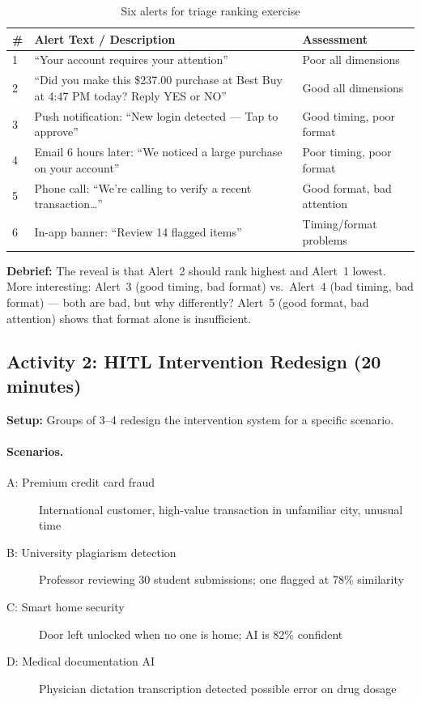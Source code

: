 \begin{table}[htbp]
\caption{Six alerts for triage ranking exercise}
\label{tab:alert-triage}
\centering
\begin{tabular}{@{}p{1cm}p{7cm}p{3.5cm}@{}}
\toprule
\textbf{\#} & \textbf{Alert Text / Description} & \textbf{Assessment} \\
\midrule
1 & ``Your account requires your attention'' & Poor all dimensions \\
2 & ``Did you make this \$237.00 purchase at Best Buy at 4:47 PM today? Reply YES or NO'' & Good all dimensions \\
3 & Push notification: ``New login detected --- Tap to approve'' & Good timing, poor format \\
4 & Email 6 hours later: ``We noticed a large purchase on your account'' & Poor timing, poor format \\
5 & Phone call: ``We're calling to verify a recent transaction\ldots'' & Good format, bad attention \\
6 & In-app banner: ``Review 14 flagged items'' & Timing/format problems \\
\bottomrule
\end{tabular}
\end{table}

\textbf{Debrief:} The reveal is that Alert~2 should rank highest and Alert~1 lowest. More interesting: Alert~3 (good timing, bad format) vs.\ Alert~4 (bad timing, bad format) --- both are bad, but why differently? Alert~5 (good format, bad attention) shows that format alone is insufficient.

\subsection{Activity 2: HITL Intervention Redesign (20 minutes)}

\textbf{Setup:} Groups of 3--4 redesign the intervention system for a specific scenario.

\paragraph{Scenarios.}
\begin{description}
    \item[A: Premium credit card fraud] International customer, high-value transaction in unfamiliar city, unusual time
    \item[B: University plagiarism detection] Professor reviewing 30 student submissions; one flagged at 78\% similarity
    \item[C: Smart home security] Door left unlocked when no one is home; AI is 82\% confident
    \item[D: Medical documentation AI] Physician dictation transcription detected possible error on drug dosage
\end{description}

